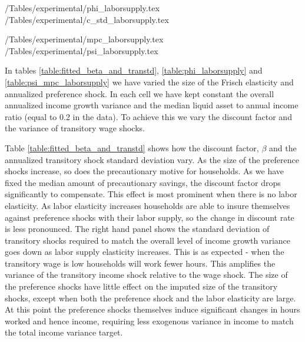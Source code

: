 \begin{center}
	\econtexRoot/Tables/experimental/phi_laborsupply.tex	
	\econtexRoot/Tables/experimental/c_std_laborsupply.tex		
	\label{table:phi_laborsupply}
\end{center}

\begin{center}
	\econtexRoot/Tables/experimental/mpc_laborsupply.tex
	\econtexRoot/Tables/experimental/psi_laborsupply.tex		
	\label{table:psi_mpc_laborsupply}
\end{center}

In tables \ref{table:fitted_beta_and_transtd}, \ref{table:phi_laborsupply} and \ref{table:psi_mpc_laborsupply} we have varied the size of the Frisch elasticity and annualized preference shock. In each cell we have kept constant the overall annualized income growth variance and the median liquid asset to annual income ratio (equal to 0.2 in the data). To achieve this we vary the discount factor and the variance of transitory wage shocks.

Table \ref{table:fitted_beta_and_transtd} shows how the discount factor, $\beta$ and the annualized transitory shock standard deviation vary. As the size of the preference shocks increase, so does the precautionary motive for households. As we have fixed the median amount of precautionary savings, the discount factor drops significantly to compensate. This effect is most prominent when there is no labor elasticity. As labor elasticity increases households are able to insure themselves against preference shocks with their labor supply, so the change in discount rate is less pronounced. The right hand panel shows the standard deviation of transitory shocks required to match the overall level of income growth variance goes down as labor supply elasticity increases. This is as expected - when the transitory wage is low households will work fewer hours. This amplifies the variance of the transitory income shock relative to the wage shock. The size of the preference shocks have little effect on the imputed size of the transitory shocks, except when both the preference shock and the labor elasticity are large. At this point the preference shocks themselves induce significant changes in hours worked and hence income, requiring less exogenous variance in income to match the total income variance target.

